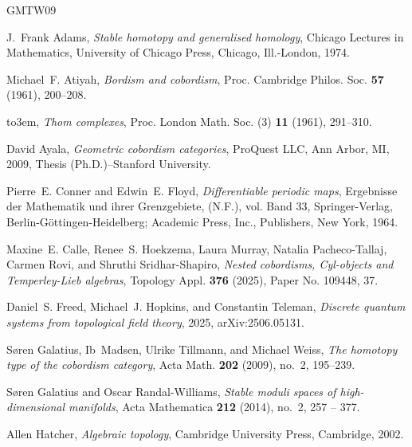 \documentclass[a4paper, 11pt,reqno]{amsart}
\theoremstyle{plain}
\theoremstyle{definition}
\begin{document}
		
\newcommand{\etalchar}[1]{$^{#1}$}
\providecommand{\bysame}{\leavevmode\hbox to3em{\hrulefill}\thinspace}
\providecommand{\MR}{\relax\ifhmode\unskip\space\fi MR }
\providecommand{\MRhref}[2]{%
  \href{http://www.ams.org/mathscinet-getitem?mr=#1}{#2}
}
\providecommand{\href}[2]{#2}
\begin{thebibliography}{GMTW09}

J.~Frank Adams, \emph{Stable homotopy and generalised homology}, Chicago Lectures in Mathematics, University of Chicago Press, Chicago, Ill.-London, 1974.

Michael~F. Atiyah, \emph{Bordism and cobordism}, Proc. Cambridge Philos. Soc. \textbf{57} (1961), 200--208.

\bysame, \emph{Thom complexes}, Proc. London Math. Soc. (3) \textbf{11} (1961), 291--310.

David Ayala, \emph{Geometric cobordism categories}, ProQuest LLC, Ann Arbor, MI, 2009, Thesis (Ph.D.)--Stanford University.

Pierre~E. Conner and Edwin~E. Floyd, \emph{Differentiable periodic maps}, Ergebnisse der Mathematik und ihrer Grenzgebiete, (N.F.), vol. Band 33, Springer-Verlag, Berlin-G\"ottingen-Heidelberg; Academic Press, Inc., Publishers, New York, 1964.

\bibitem[CHM{\etalchar{+}}25]{cyl}
Maxine~E. Calle, Renee~S. Hoekzema, Laura Murray, Natalia Pacheco-Tallaj, Carmen Rovi, and Shruthi Sridhar-Shapiro, \emph{Nested cobordisms, {C}yl-objects and {T}emperley-{L}ieb algebras}, Topology Appl. \textbf{376} (2025), Paper No. 109448, 37.

Daniel~S. Freed, Michael~J. Hopkins, and Constantin Teleman, \emph{Discrete quantum systems from topological field theory}, 2025, arXiv:2506.05131.

S{\o}ren Galatius, Ib~Madsen, Ulrike Tillmann, and Michael Weiss, \emph{The homotopy type of the cobordism category}, Acta Math. \textbf{202} (2009), no.~2, 195--239.

S{\o}ren Galatius and Oscar Randal-Williams, \emph{{Stable moduli spaces of high-dimensional manifolds}}, Acta Mathematica \textbf{212} (2014), no.~2, 257 -- 377.

Allen Hatcher, \emph{Algebraic topology}, Cambridge University Press, Cambridge, 2002.


\end{thebibliography}
\end{document}

